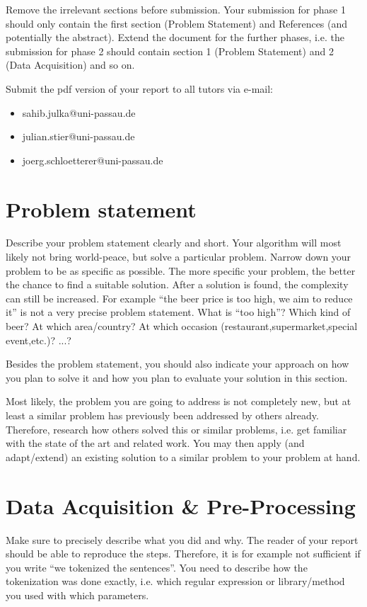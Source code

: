 \documentclass[sigconf]{acmart}
\begin{document}
Remove the irrelevant sections before submission.
Your submission for phase 1 should only contain the first section (Problem Statement) and References (and potentially the abstract).
Extend the document for the further phases, i.e. the submission for phase 2 should contain section 1 (Problem Statement) and 2 (Data Acquisition) and so on.

Submit the pdf version of your report to all tutors via e-mail:
\begin{itemize}
 \item sahib.julka@uni-passau.de
 \item julian.stier@uni-passau.de
 \item joerg.schloetterer@uni-passau.de
\end{itemize}


\section{Problem statement}
Describe your problem statement clearly and short.
Your algorithm will most likely not bring world-peace, but solve a particular problem.
Narrow down your problem to be as specific as possible. 
The more specific your problem, the better the chance to find a suitable solution. After a solution is found, the complexity can still be increased.
For example ``the beer price is too high, we aim to reduce it'' is not a very precise problem statement. What is ``too high''? Which kind of beer? At which area/country? At which occasion (restaurant,supermarket,special event,etc.)? ...?

Besides the problem statement, you should also indicate your approach on how you plan to solve it and how you plan to evaluate your solution in this section.

Most likely, the problem you are going to address is not completely new, but at least a similar problem has previously been addressed by others already.
Therefore, research how others solved this or similar problems, i.e. get familiar with the state of the art and related work.
You may then apply (and adapt/extend) an existing solution to a similar problem to your problem at hand.

\section{Data Acquisition \& Pre-Processing}
Make sure to precisely describe what you did and why.
The reader of your report should be able to reproduce the steps.
Therefore, it is for example not sufficient if you write ``we tokenized the sentences''.
You need to describe how the tokenization was done exactly, i.e. which regular expression or library/method you used with which parameters.
\end{document}
